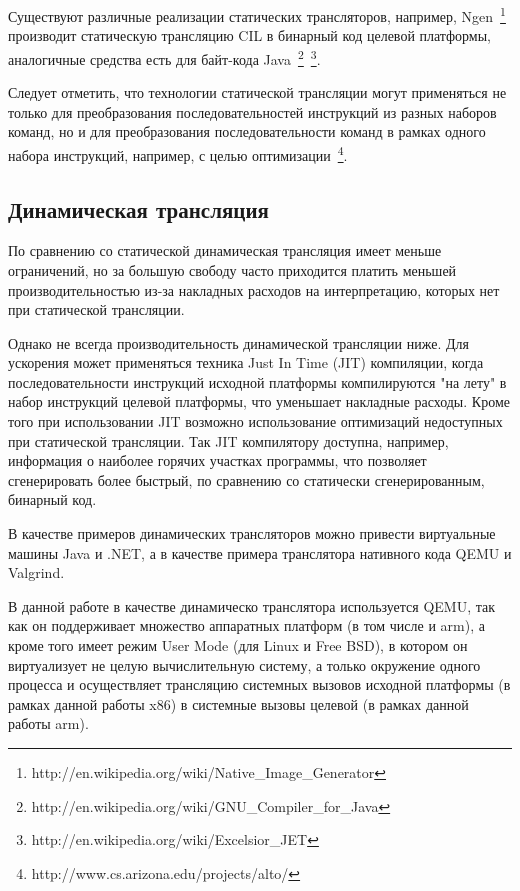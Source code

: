 Существуют различные реализации статических трансляторов, например, Ngen~\footnote{http://en.wikipedia.org/wiki/Native\_Image\_Generator} производит статическую трансляцию CIL в бинарный код целевой платформы, аналогичные средства есть для байт-кода Java~\footnote{http://en.wikipedia.org/wiki/GNU\_Compiler\_for\_Java}~\footnote{http://en.wikipedia.org/wiki/Excelsior\_JET}.

Следует отметить, что технологии статической трансляции могут применяться не только для преобразования последовательностей инструкций из разных наборов команд, но и для преобразования последовательности команд в рамках одного набора инструкций, например, с целью оптимизации~\footnote{http://www.cs.arizona.edu/projects/alto/}.

\subsection{Динамическая трансляция}\label{dynamic_translation}

По сравнению со статической динамическая трансляция имеет меньше ограничений, но за большую свободу часто приходится платить меньшей производительностью из-за накладных расходов на интерпретацию, которых нет при статической трансляции.

Однако не всегда производительность динамической трансляции ниже. Для ускорения может применяться техника Just In Time (JIT) компиляции, когда последовательности инструкций исходной платформы компилируются "на лету" в набор инструкций целевой платформы, что уменьшает накладные расходы. Кроме того при использовании JIT возможно использование оптимизаций недоступных при статической трансляции. Так JIT компилятору доступна, например, информация о наиболее горячих участках программы, что позволяет сгенерировать более быстрый, по сравнению со статически сгенерированным, бинарный код.

В качестве примеров динамических трансляторов можно привести виртуальные машины Java и .NET, а в качестве примера транслятора нативного кода QEMU и Valgrind.

В данной работе в качестве динамическо транслятора используется QEMU, так как он поддерживает множество аппаратных платформ (в том числе и arm), а кроме того имеет режим User Mode (для Linux и Free BSD), в котором он виртуализует не целую вычислительную систему, а только окружение одного процесса и осуществляет трансляцию системных вызовов исходной платформы (в рамках данной работы x86) в системные вызовы целевой (в рамках данной работы arm).

